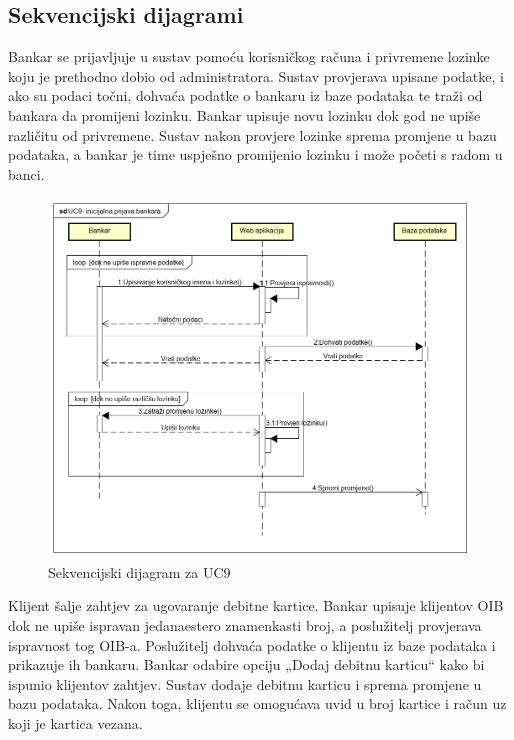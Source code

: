 			\subsection{Sekvencijski dijagrami}
				
				
				Bankar se prijavljuje u sustav pomoću korisničkog računa i privremene lozinke koju je prethodno dobio od administratora. Sustav provjerava upisane podatke, i ako su podaci točni, dohvaća podatke o bankaru iz baze podataka te traži od bankara da promijeni lozinku. Bankar upisuje novu lozinku dok god ne upiše različitu od privremene. Sustav nakon provjere lozinke sprema promjene u bazu podataka, a bankar je time uspješno promijenio lozinku i može početi s radom u banci.
				\eject
				
				\begin{figure}[H]
					\includegraphics[scale=0.6]{slike/UC9- inicijalna prijava bankara.PNG}
					\centering
					\caption{Sekvencijski dijagram za UC9}
					\label{fig:uc9}
				\end{figure}
			\eject
			
			
			Klijent šalje zahtjev za ugovaranje debitne kartice. Bankar upisuje klijentov OIB dok ne upiše ispravan jedanaestero znamenkasti broj, a poslužitelj provjerava ispravnost tog OIB-a. Poslužitelj dohvaća podatke o klijentu iz baze podataka i prikazuje ih bankaru. Bankar odabire opciju „Dodaj debitnu karticu“ kako bi ispunio klijentov zahtjev. Sustav dodaje debitnu karticu i sprema promjene u bazu podataka. Nakon toga, klijentu se omogućava uvid u broj kartice i račun uz koji je kartica vezana.
			\eject
			
